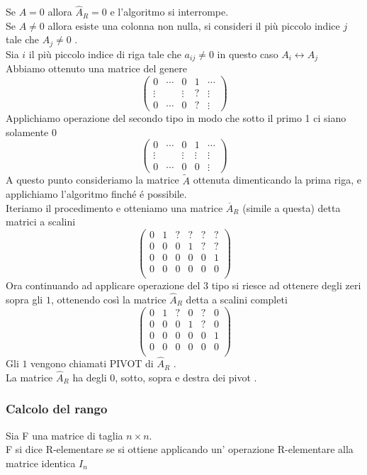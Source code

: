 Se $ A=0 $ allora $\hat{A}_R=0$ e l'algoritmo si interrompe.\\
Se $ A \neq 0 $ allora esiste una colonna non nulla, si consideri il più piccolo indice $j$ tale che $A_j \neq 0 $ .\\
Sia $i$ il più piccolo indice di riga tale che $a_{ij}\neq 0 $ in questo caso $A_i\leftrightarrow A_j$\\
Abbiamo ottenuto una matrice del genere 
$$\begin{pmatrix}
0 & \cdots & 0 & 1 & \cdots\\
\vdots & & \vdots & ? & \vdots\\
0 & \cdots & 0 & ? & \vdots
\end{pmatrix}$$Applichiamo operazione del secondo tipo in modo che sotto il primo 1 ci siano solamente 0 
$$\begin{pmatrix}
0 & \cdots & 0 & 1 & \cdots\\
\vdots & & \vdots & \vdots & \vdots\\
0 & \cdots & 0 & 0 & \vdots
\end{pmatrix}$$A questo punto consideriamo la matrice $ \tilde{A}$ ottenuta dimenticando la prima riga, e applichiamo l'algoritmo finché é possibile.\\
Iteriamo il procedimento e otteniamo una matrice $\overline{A}_R$ (simile a questa) detta matrici a scalini
$$\begin{pmatrix}
0 & 1 &  ? & ?  &? & ? \\
0 & 0 & 0 & 1 &? & ?\\
0 & 0 & 0 & 0 & 0& 1\\
0 & 0 & 0 & 0 & 0& 0 \\
\end{pmatrix}$$
Ora continuando ad applicare operazione del 3 tipo si riesce ad ottenere degli zeri sopra gli $1$, ottenendo così la matrice $\hat{A}_R $ detta a scalini completi
$$\begin{pmatrix}
0 & 1 &  ? & 0  &? & 0 \\
0 & 0 & 0 & 1 &? & 0\\
0 & 0 & 0 & 0 & 0& 1\\
0 & 0 & 0 & 0 & 0& 0 \\
\end{pmatrix}$$
Gli $1$ vengono chiamati PIVOT di $\hat{A}_R$ .\\
La matrice $\hat{A}_R$ ha degli 0, sotto, sopra e destra dei pivot .
\spazio
\subsubsection{Calcolo del rango}
\begin{defn}\bianco
Sia F una matrice di taglia $ n \times n $.\\
 F si dice  R-elementare se si ottiene applicando un' operazione R-elementare alla matrice identica $I_n$
\end{defn}

